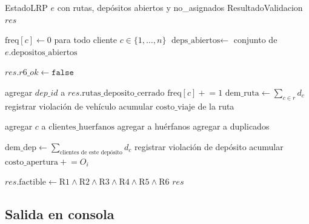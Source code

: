 \documentclass[12pt,a4paper]{article}
\begin{document}
\begin{algorithm}[H]
\caption{Validar solución LRP}
\begin{algorithmic}[1]
\Require EstadoLRP $e$ con rutas, depósitos abiertos y no\_asignados
\Ensure ResultadoValidacion $res$

\State $\text{freq}[c] \gets 0$ para todo cliente $c \in \{1,\ldots,n\}$
\State $\text{deps\_abiertos} \gets$ conjunto de $e.\text{depositos\_abiertos}$

\State {}
      \State $res.r6\_ok \gets \texttt{false}$
    \EndIf
  \EndFor
\EndFor

\State {}
    \State agregar $dep\_id$ a $res.\text{rutas\_deposito\_cerrado}$ 
  \EndIf
      \State $\text{freq}[c] \mathrel{+}= 1$
    \EndFor
    \State $\text{dem\_ruta} \gets \sum_{c \in r} d_c$
      \State registrar violación de vehículo 
    \EndIf
    \State acumular $\text{costo\_viaje}$ de la ruta
  \EndFor
\EndFor

\State {}
  \State agregar $c$ a $\text{clientes\_huerfanos}$
\EndFor
{}
    agregar a huérfanos
    agregar a duplicados
  \EndIf
\EndFor

\State {}
  \State $\text{dem\_dep} \gets \sum_{\text{clientes de este depósito}} d_c$
    \State registrar violación de depósito
  \EndIf
  \State acumular $\text{costo\_apertura} \mathrel{+}= O_i$
\EndFor

\State $res.\text{factible} \gets \text{R1} \wedge \text{R2} \wedge \text{R3} \wedge \text{R4} \wedge \text{R5} \wedge \text{R6}$
\State \Return $res$
\end{algorithmic}
\end{algorithm}

\subsection{Salida en consola}
\end{document}
